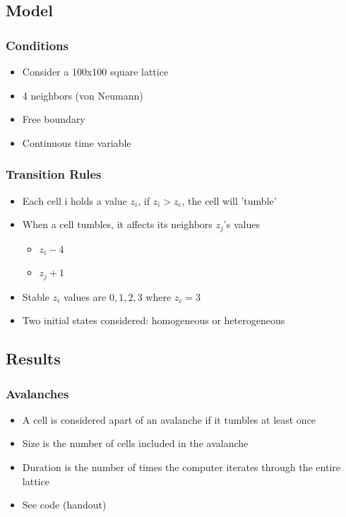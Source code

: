 \documentclass{beamer}
\begin{document}
\subsection{Model}
\frame
{
  \frametitle{Conditions}

  \begin{itemize}
  \item Consider a 100x100 square lattice
  \item 4 neighbors (von Neumann)
  \item Free boundary
  \item Continuous time variable
   \end{itemize}
}


\frame
{
 \frametitle{Transition Rules}
 \begin{itemize}
  \item<1-> Each cell i holds a value $z_{i}$, if $z_{i}  > z_{c}$, the cell will 'tumble'
  \item<2-> When a cell tumbles, it affects its neighbors $z_{j}$'s values
  \begin{itemize}
  \item $z_{i} - 4$
  \item $z_{j} + 1$
  \end{itemize}
  \item <3->Stable $z_{i}$ values are  $0,1,2,3$ where $z_{c} = 3$
  \item <4->Two initial states considered: homogeneous or heterogeneous
\end{itemize}

}


\subsection{Results}
\frame
{
  \frametitle{Avalanches}

  \begin{itemize}
  \item A cell is considered apart of an avalanche if it tumbles at least once
  \item Size is the number of cells included in the avalanche
  \item Duration is the number of times the computer iterates through the entire lattice   
  \item See code (handout)
  \end{itemize}
}
\end{document}
